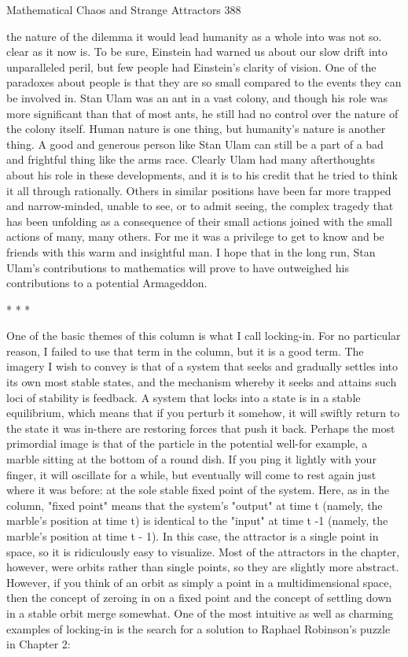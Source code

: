 Mathematical Chaos and Strange Attractors                                           388

the nature of the dilemma it would lead humanity as a whole into was not so. clear as
it now is. To be sure, Einstein had warned us about our slow drift into unparalleled
peril, but few people had Einstein's clarity of vision. One of the paradoxes about
people is that they are so small compared to the events they can be involved in. Stan
Ulam was an ant in a vast colony, and though his role was more significant than that
of most ants, he still had no control over the nature of the colony itself. Human nature
is one thing, but humanity's nature is another thing.
        A good and generous person like Stan Ulam can still be a part of a bad and
frightful thing like the arms race. Clearly Ulam had many afterthoughts about his role
in these developments, and it is to his credit that he tried to think it all through
rationally. Others in similar positions have been far more trapped and narrow-minded,
unable to see, or to admit seeing, the complex tragedy that has been unfolding as a
consequence of their small actions joined with the small actions of many, many
others. For me it was a privilege to get to know and be friends with this warm and
insightful man. I hope that in the long run, Stan Ulam's contributions to mathematics
will prove to have outweighed his contributions to a potential Armageddon.

                                         *   *   *

        One of the basic themes of this column is what I call locking-in. For no
particular reason, I failed to use that term in the column, but it is a good term. The
imagery I wish to convey is that of a system that seeks and gradually settles into its
own most stable states, and the mechanism whereby it seeks and attains such loci of
stability is feedback. A system that locks into a state is in a stable equilibrium, which
means that if you perturb it somehow, it will swiftly return to the state it was in-there
are restoring forces that push it back. Perhaps the most primordial image is that of the
particle in the potential well-for example, a marble sitting at the bottom of a round
dish. If you ping it lightly with your finger, it will oscillate for a while, but eventually
will come to rest again just where it was before: at the sole stable fixed point of the
system. Here, as in the column, "fixed point" means that the system's "output" at time
t (namely, the marble's position at time t) is identical to the "input" at time t -1
(namely, the marble's position at time t - 1). In this case, the attractor is a single point
in space, so it is ridiculously easy to visualize. Most of the attractors in the chapter,
however, were orbits rather than single points, so they are slightly more abstract.
However, if you think of an orbit as simply a point in a multidimensional space, then
the concept of zeroing in on a fixed point and the concept of settling down in a stable
orbit merge somewhat.
        One of the most intuitive as well as charming examples of locking-in is the
search for a solution to Raphael Robinson's puzzle in Chapter 2:




